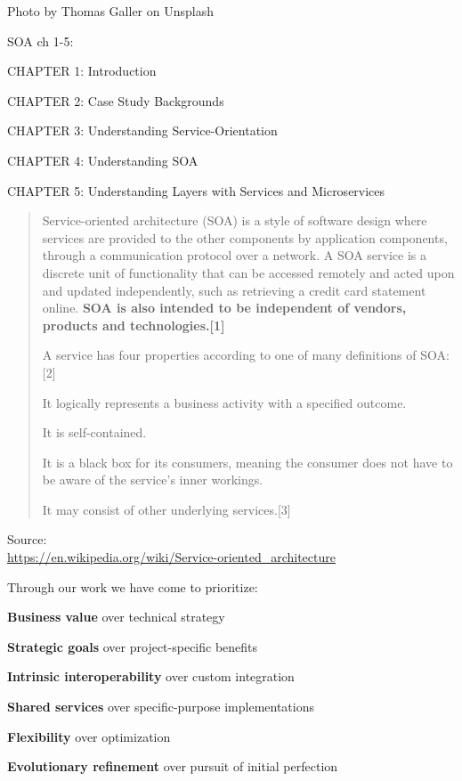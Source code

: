 \documentclass[Screen16to9,17pt]{foils}
\begin{document}
Photo by Thomas Galler on Unsplash







SOA ch 1-5:
\begin{list2}
\item CHAPTER 1: Introduction
\item CHAPTER 2: Case Study Backgrounds
\item CHAPTER 3: Understanding Service-Orientation
\item CHAPTER 4: Understanding SOA
\item CHAPTER 5: Understanding Layers with Services and Microservices
\end{list2}


\begin{quote}
Service-oriented architecture (SOA) is a style of software design where services are provided to the other components by application components, through a communication protocol over a network. A SOA service is a discrete unit of functionality that can be accessed remotely and acted upon and updated independently, such as retrieving a credit card statement online. {\bf SOA is also intended to be independent of vendors, products and technologies.[1]}

A service has four properties according to one of many definitions of SOA:[2]
\begin{list2}
\item It logically represents a business activity with a specified outcome.
\item It is self-contained.
\item It is a black box for its consumers, meaning the consumer does not have to be aware of the service's inner workings.
\item It may consist of other underlying services.[3]
\end{list2}
\end{quote}
Source:{\footnotesize\\
\url{https://en.wikipedia.org/wiki/Service-oriented_architecture}}




Through our work we have come to prioritize:
\begin{list2}
\item {\bf Business value} over technical strategy
\item {\bf Strategic goals} over project-specific benefits
\item {\bf Intrinsic interoperability} over custom integration
\item {\bf Shared services} over specific-purpose implementations
\item {\bf Flexibility} over optimization
\item {\bf Evolutionary refinement} over pursuit of initial perfection
\end{list2}
\end{document}

